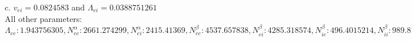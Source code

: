 \documentclass[a4paper,12pt]{article}
\begin{document}
\begin{figure}
{	c. $v_{ei} = 0.0824583$ and $\Lambda_{ei} = 0.0388751261$\\
All other parameters:\\
$\Lambda_{ee}: 1.943756305, N^{\alpha}_{ee}: 2661.274299, N^{\alpha}_{ei}: 2415.41369,
N^{\beta}_{ee}: 4537.657838, N^{\beta}_{ei}: 4285.318574, N^{\beta}_{ie}: 496.4015214, N^{\beta}_{ii}: 989.8177416,
\Gamma_{ee}: 0.426272815, \Gamma_{ei}: 1.718762667, \Gamma_{ie}: 0.857083964, \Gamma_{ii}: 1.322388202,
\gamma_{ee}: 0.78950312677, \gamma_{ei}: 0.82632296, \gamma_{ie}: 0.14776569,
\gamma_{ii}: 0.04887233, h^{rest}_e: -75.54580909, h^{eq}_{ee}: -16.50733437, h^{eq}_{ei}: -2.729873877,
h^{rest}_i: -75.55674507, h^{eq}_{ie}: -88.67197452, h^{eq}_{ii}: -85.43395694,
\mu_e: -42.50180811, \mu_i: -48.70101116, p_{ee}: 7.1858700524, p_{ei}: 6.7944395893, p_{ie}: 0.0, p_{ii}: 0.0, \phi_{ie}: 0,
\phi_{ii}: 0, S^{max}_e: 0.450176, S^{max}_i: 0.07468, \sigma_e: 5.024823991,
\sigma_i: 3.22531141, \tau_e: 38.9, \tau_i: 137.859, v_{ee}: 0.824583$}
\end{figure}
\end{document}
